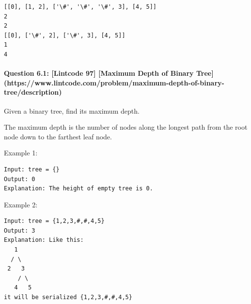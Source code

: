 \documentclass[11pt]{article}
\begin{document}
    \begin{Verbatim}[commandchars=\\\{\}]
[[0], [1, 2], ['\#', '\#', '\#', 3], [4, 5]]
2
2
[[0], ['\#', 2], ['\#', 3], [4, 5]]
1
4

    \end{Verbatim}

    \paragraph{Question 6.1: {[}Lintcode 97{]} {[}Maximum Depth of Binary
Tree{]}(https://www.lintcode.com/problem/maximum-depth-of-binary-tree/description)}\label{question-6.1-lintcode-97-maximum-depth-of-binary-treehttpswww.lintcode.comproblemmaximum-depth-of-binary-treedescription}

Given a binary tree, find its maximum depth.

The maximum depth is the number of nodes along the longest path from the
root node down to the farthest leaf node.

Example 1:

\begin{verbatim}
Input: tree = {}
Output: 0
Explanation: The height of empty tree is 0.
\end{verbatim}

Example 2:

\begin{verbatim}
Input: tree = {1,2,3,#,#,4,5}
Output: 3   
Explanation: Like this:
   1
  / \                
 2   3                
    / \                
   4   5
it will be serialized {1,2,3,#,#,4,5}
\end{verbatim}
\end{document}
